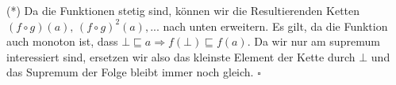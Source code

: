 \documentclass[11pt,a4paper,ngerman]{article}
\begin{document}
(*) Da die Funktionen stetig sind, können wir die Resultierenden Ketten $(f\circ g)(a), \, (f \circ g)^2 (a), ...$ nach unten erweitern.
Es gilt, da die Funktion auch monoton ist, dass $\bot \sqsubseteq a \Rightarrow f(\bot) \sqsubseteq f(a)$. Da wir nur am supremum
interessiert sind, ersetzen wir also das kleinste Element der Kette durch $\bot$ und das Supremum der Folge bleibt immer noch gleich.
\mbox{} \hfill $\square$
\label{LastPage}
\end{document}
